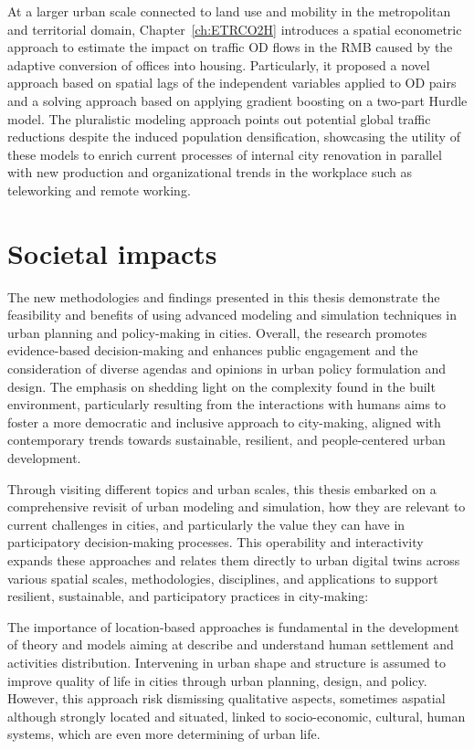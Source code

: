 At a larger urban scale connected to land use and mobility in the metropolitan and territorial domain, Chapter~\ref{ch:ETRCO2H} introduces a spatial econometric approach to estimate the impact on traffic OD flows in the RMB caused by the adaptive conversion of offices into housing. Particularly, it proposed a novel approach based on spatial lags of the independent variables applied to OD pairs and a solving approach based on applying gradient boosting on a two-part Hurdle model. The pluralistic modeling approach points out potential global traffic reductions despite the induced population densification, showcasing the utility of these models to enrich current processes of internal city renovation in parallel with new production and organizational trends in the workplace such as teleworking and remote working.

\section{Societal impacts}

The new methodologies and findings presented in this thesis demonstrate the feasibility and benefits of using advanced modeling and simulation techniques in urban planning and policy-making in cities. Overall, the research promotes evidence-based decision-making and enhances public engagement and the consideration of diverse agendas and opinions in urban policy formulation and design. The emphasis on shedding light on the complexity found in the built environment, particularly resulting from the interactions with humans aims to foster a more democratic and inclusive approach to city-making, aligned with contemporary trends towards sustainable, resilient, and people-centered urban development.



Through visiting different topics and urban scales, this thesis embarked on a comprehensive revisit of urban modeling and simulation, how they are relevant to current challenges in cities, and particularly the value they can have in participatory decision-making processes. This operability and interactivity expands these approaches and  relates them directly to urban digital twins across various spatial scales, methodologies, disciplines, and applications to support resilient, sustainable, and participatory practices in city-making:

The importance of location-based approaches is fundamental in the development of theory and models aiming at describe and understand human settlement and activities distribution. Intervening in urban shape and structure is assumed to improve quality of life in cities through urban planning, design, and policy. However, this approach risk dismissing qualitative aspects, sometimes aspatial although strongly located and situated, linked to socio-economic, cultural, human systems, which are even more determining of urban life. %

